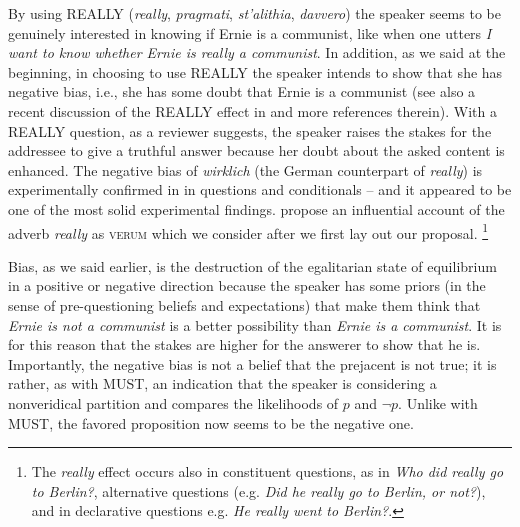 \documentclass[output=paper,colorlinks,citecolor=brown]{langscibook}
\begin{document}
By using \textsc{REALLY} (\textit{really}, \textit{pragmati}, \textit{st'alithia}, \textit{davvero}) the speaker seems to be genuinely interested in knowing  if Ernie is a communist, like when one utters \textit{I want to know whether Ernie is really a communist}. In addition, as we said at the beginning, in choosing to use \textsc{REALLY} the speaker intends to show that she has negative bias, i.e., she has some doubt that Ernie is a communist (see also a recent discussion of the \textsc{REALLY} effect in \citealt{Bill2020} and more references therein). With a \textsc{REALLY} question, as a reviewer suggests,  the speaker raises the stakes for the addressee to give a truthful answer because her doubt about the asked content is enhanced. The negative bias of \textit{wirklich} (the German counterpart of \textit{really}) is experimentally confirmed in \citet{liu2021} in questions and conditionals --  and it appeared to be one of the most solid experimental findings. \citet{romero2004} propose an influential account of the adverb \textit{really} as \textsc{verum} which we consider after we first lay out our proposal.  \footnote{The \textit{really} effect occurs also in constituent questions, as in \textit{Who did really go to Berlin?}, alternative questions (e.g. \textit{Did he really go to Berlin, or not?}), and in declarative questions  e.g. \textit{He really went to Berlin?}. }



Bias, as we said earlier, is the destruction of the egalitarian state of equilibrium in a positive or negative direction because the speaker has some priors (in the sense of pre-questioning beliefs and expectations) that make them think that \textit{Ernie is not a communist} is a better possibility than \textit{Ernie is a communist}.  It is for this reason that the stakes are higher for the answerer to show that he is. Importantly, the negative bias is not a belief that the prejacent is not true; it is rather, as with \textsc{MUST}, an indication that the speaker is considering a nonveridical partition and compares the likelihoods of $p$ and $\neg p$. Unlike with \textsc{MUST}, the favored proposition now seems to be the negative one. 
  
\end{document}
